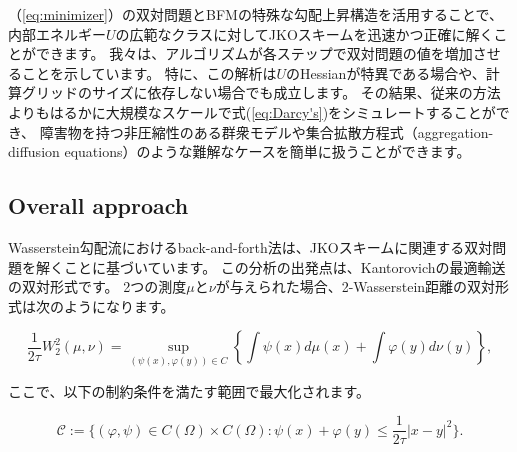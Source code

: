 \documentclass{jsarticle}
\theoremstyle{definition}
\begin{document}
{\color{red}
（\ref{eq:minimizer}）の双対問題とBFMの特殊な勾配上昇構造を活用することで、内部エネルギー$U$の広範なクラスに対してJKOスキームを迅速かつ正確に解くことができます。
我々は、アルゴリズムが各ステップで双対問題の値を増加させることを示しています。
特に、この解析は$U$のHessianが特異である場合や、計算グリッドのサイズに依存しない場合でも成立します。
その結果、従来の方法よりもはるかに大規模なスケールで式(\ref{eq:Darcy's})をシミュレートすることができ、
障害物を持つ非圧縮性のある群衆モデルや集合拡散方程式（aggregation-diffusion equations）のような難解なケースを簡単に扱うことができます。
}

\subsection{Overall approach}

Wasserstein勾配流におけるback-and-forth法は、JKOスキームに関連する双対問題を解くことに基づいています。
この分析の出発点は、Kantorovichの最適輸送の双対形式です。
2つの測度$\mu$と$\nu$が与えられた場合、2-Wasserstein距離の双対形式は次のようになります。

\begin{equation}
    \frac{1}{2 \tau}W_2^2(\mu, \nu) = \sup_{(\psi(x), \varphi(y)) \in C}  \left\{ \int \psi(x) d\mu(x) + \int \varphi(y) d\nu(y) \right\},
\end{equation}

ここで、以下の制約条件を満たす範囲で最大化されます。

$$
    \mathcal{C}  := \{(\varphi, \psi) \in C(\Omega) \times C(\Omega) : \psi(x) + \varphi(y) \leq \frac{1}{2 \tau} |x - y|^2 \}. 
$$
\vspace\baselineskip 
\end{document}
